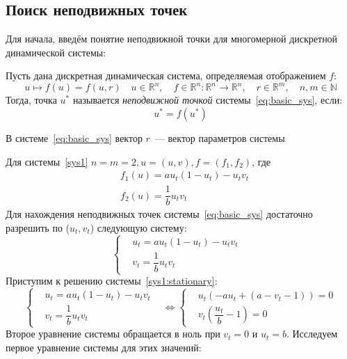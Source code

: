\subsection{Поиск неподвижных точек}
Для начала, введём понятие неподвижной точки для многомерной дискретной динамической системы:
\begin{definition}\label{def:stationary} Пусть дана дискретная динамическая система, определяемая отображением \(f\):
    \begin{equation}
        \label{eq:basic_sys}
        u \mapsto f(u) = f(u, r) \quad u \in \mathbb{R}^n,\quad f \in \mathbb{R}^n: \mathbb{R}^n \rightarrow \mathbb{R}^n,\quad r \in \mathbb{R}^m, \quad n,m \in \mathbb{N}
    \end{equation}
    Тогда, точка \(u^*\) называется \emph{неподвижной точкой} системы~\eqref{eq:basic_sys}, если:
    \begin{equation*}
        u^* = f(u^*)
    \end{equation*}
\end{definition}
\begin{note} В системе~\eqref{eq:basic_sys} вектор \(r\)~--- вектор параметров системы
\end{note}
\noindent
Для системы~\eqref{sys1} \(n = m = 2, u = (u, v), f = (f_1, f_2)\), где 
\begin{align*}
    &f_1(u) = au_t(1 - u_t) - u_tv_t \\
    &f_2(u) = \dfrac{1}{b}u_tv_t
\end{align*}
Для нахождения неподвижных точек системы~\eqref{eq:basic_sys} достаточно разрешить по (\(u_t, v_t\)) следующую систему:
\begin{equation}
   \label{sys1:stationary}
   \left\{
   \begin{aligned}
       &u_t = au_t(1 - u_t) - u_tv_t&\\
       &v_t = \dfrac{1}{b}u_tv_t&
   \end{aligned}
   \right.
\end{equation}
Приступим к решению системы~\eqref{sys1:stationary}:
\begin{equation*}
    \left\{
    \begin{aligned}
        &u_t = au_t(1 - u_t) - u_tv_t&\\
        &v_t = \dfrac{1}{b}u_tv_t&
    \end{aligned}
    \right.
    \Longleftrightarrow 
    \left\{
    \begin{aligned}
        &u_t(-au_t + (a - v_t - 1)) = 0\\
        &v_t(\dfrac{u_t}{b} - 1) = 0
    \end{aligned}
    \right.
\end{equation*}
Второе уравнение системы обращается в ноль при \(v_t = 0\) и \(u_t = b\). Исследуем первое уравнение системы для этих значений:
\begin{equation*}
    
\end{equation*}